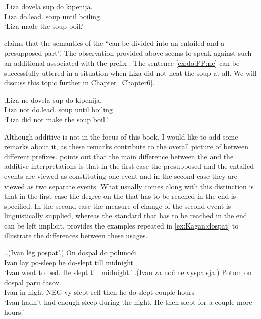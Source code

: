\exg.\label{ex:do:PP}Liza dovela sup do kipenija.\\
Liza do.lead. soup until boiling\\
\trans `Liza made the soup boil.'

\citet[75]{Kagan:book} claims that the semantics of the   ``can be divided into an entailed and a presupposed part''. The observation provided above seems to speak against such an additional  associated with the prefix . The sentence \ref{ex:do:PP:ne} can be successfully uttered in a situation when Liza did not heat the soup at all. We will discuss this topic further in Chapter~\ref{Chapter6}.\largerpage[-2]

\exg.\label{ex:do:PP:ne}Liza ne dovela sup do kipenija.\\
Liza not do.lead. soup until boiling\\
\trans `Liza did not make the soup boil.'

Although additive  is not in the focus of this book, I would like to add some remarks about it, as these remarks contribute to the overall picture of  between different prefixes. \citet[79]{Kagan:book} points out that the main difference between the  and the additive interpretations is that in the first case the presupposed and the entailed events are viewed as constituting one event and in the second case they are viewed as two separate events. What usually comes along with this distinction is that in the first case the degree on the  that has to be reached in the end is specified. In the second case the measure of change of the second event is linguistically supplied, whereas the  standard that has to be reached in the end can be left implicit. \citet[79]{Kagan:book} provides the examples repeated in \ref{ex:Kagan:dospat} to illustrate the differences between these usages.

\ex.\label{ex:Kagan:dospat}\ag.\label{ex:Kagan:dospat:1}(Ivan l\"{e}g pospat'.) On dospal do poluno\v{c}i.\\
Ivan lay po-sleep he do-slept till midnight\\
\trans `Ivan went to bed. He slept till midnight.'
\bg.\label{ex:Kagan:dospat:2}(Ivan za no\v{c} ne vyspalsja.) Potom on dospal paru \v{c}asov.\\
Ivan in night NEG vy-slept-refl then he do-slept couple hours\\
\trans `Ivan hadn't had enough sleep during the night. He then slept for a couple more hours.'

